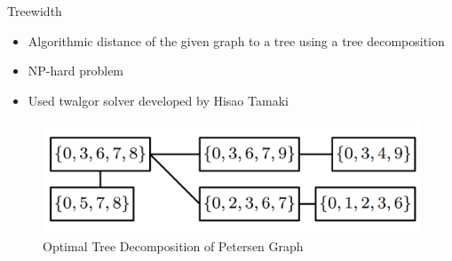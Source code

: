 \documentclass{beamer}
\begin{document}
\begin{frame}[t]{Treewidth}
    \begin{itemize}
        \item Algorithmic distance of the given graph to a tree using a tree decomposition
        \item NP-hard problem
        \item Used twalgor solver developed by Hisao Tamaki
    \end{itemize}
    \begin{figure}
        \centering
        \includegraphics[width=0.5\linewidth]{img/petersen_tree_decomposition.png}
        \caption{Optimal Tree Decomposition of Petersen Graph}
    \end{figure}
\end{frame}
\end{document}
